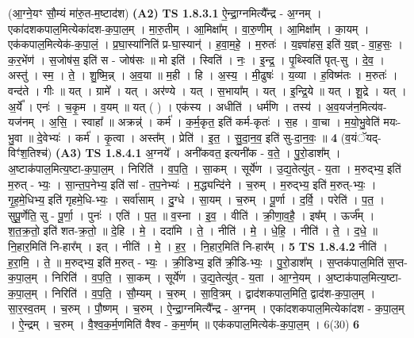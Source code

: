 \documentclass[17pt]{extarticle}
\begin{document}
                  \newline
                      (आ॒ग्ने॒यꣳ सौ॒म्यं मा॑रु॒त-म॒ष्टाद॑श)  \textbf{(A2)} \newline \newline
                                \textbf{ TS 1.8.3.1} \newline
                  ऐ॒न्द्रा॒ग्नमित्यै᳚न्द्र - अ॒ग्नम् । एका॑दशकपाल॒मित्येका॑दश-क॒पा॒ल॒म् । मा॒रु॒तीम् । आ॒मिक्षा᳚म् । वा॒रु॒णीम् । आ॒मिक्षा᳚म् । का॒यम् । एक॑कपाल॒मित्येक॑-क॒पा॒लं॒ । प्र॒घा॒स्या॑निति॑ प्र-घा॒स्यान्॑ । ह॒वा॒म॒हे॒ । म॒रुतः॑ । य॒ज्ञ्वा॑हस॒ इति॑ य॒ज्ञ् - वा॒ह॒सः॒ । क॒र॒भेंण॑ । स॒जोष॑स॒ इति॑ स - जोष॑सः ॥ मो इति॑ । स्विति॑ । नः॒ । इ॒न्द्र॒ । पृ॒थ्स्विति॑ पृत्-सु । दे॒व॒ । अस्तु॑ । स्म॒ । ते॒ । शु॒ष्मि॒न्न् । अ॒व॒या ॥ म॒ही । हि । अ॒स्य॒ । मी॒ढुषः॑ । य॒व्या । ह॒विष्म॑तः । म॒रुतः॑ । वन्द॑ते । गीः ॥ यत् । ग्रामे᳚ । यत् । अर॑ण्ये । यत् । स॒भाया᳚म् । यत् । इ॒न्द्रि॒ये ॥ यत् । शू॒द्रे । यत् । अ॒र्ये᳚ । एनः॑ । च॒कृ॒म । व॒यम् ॥ यत् ( ) । एक॑स्य । अधीति॑ । धर्म॑णि । तस्य॑ । अ॒व॒यज॑न॒मित्य॑व-यज॑नम् । अ॒सि॒ । स्वाहा᳚ ॥ अक्रन्न्॑ । कर्म॑ । क॒र्म॒कृत॒ इति॑ कर्म-कृतः॑ । स॒ह । वा॒चा । म॒यो॒भु॒वेति॑ मयः-भु॒वा ॥ दे॒वेभ्यः॑ । कर्म॑ । कृ॒त्वा । अस्त᳚म् । प्रेति॑ । इ॒त॒ । सु॒दा॒न॒व॒ इति॑ सु-दा॒न॒वः॒ ॥ \textbf{  4 } \newline
                  \newline
                      (व॒यंॅयद्-विꣳ॑श॒तिश्च॑)  \textbf{(A3)} \newline \newline
                                \textbf{ TS 1.8.4.1} \newline
                  अ॒ग्नये᳚ । अनी॑कवत॒ इत्यनी॑क - व॒ते॒ । पु॒रो॒डाश᳚म् । अ॒ष्टाक॑पाल॒मित्य॒ष्टा-क॒पा॒ल॒म् । निरिति॑ । व॒प॒ति॒ । सा॒कम् । सूर्ये॑ण । उ॒द्य॒तेत्यु॑त् - य॒ता । म॒रुद्भ्य॒ इति॑ म॒रुत् - भ्यः॒ । सा॒न्त॒प॒नेभ्य॒ इति॑ सां - त॒प॒नेभ्यः॑ । म॒द्ध्यन्दि॑ने । च॒रुम् । म॒रुद्भ्य॒ इति॑ म॒रुत्-भ्यः॒ । गृ॒ह॒मे॒धिभ्य॒ इति॑ गृहमे॒धि-भ्यः॒ । सर्वा॑साम् । दु॒ग्धे । सा॒यम् । च॒रुम् । पू॒र्णा । द॒र्वि॒ । परेति॑ । प॒त॒ । सुपू॒र्णेति॒ सु - पू॒र्णा॒ । पुनः॑ । एति॑ । प॒त॒ ॥ व॒स्ना । इ॒व॒ । वीति॑ । क्री॒णा॒व॒है॒ । इष᳚म् । ऊर्ज᳚म् । श॒त॒क्र॒तो॒ इति॑ शत-क्र॒तो॒ ॥ दे॒हि । मे॒ । ददा॑मि । ते॒ । नीति॑ । मे॒ । धे॒हि॒ । नीति॑ । ते॒ । द॒धे॒ ॥ नि॒हार॒मिति॑ नि-हार᳚म् । इत् । नीति॑ । मे॒ । ह॒र॒ । नि॒हार॒मिति॑ नि-हार᳚म् । \textbf{  5} \newline
                  \newline
                                \textbf{ TS 1.8.4.2} \newline
                  नीति॑ । ह॒रा॒मि॒ । ते॒ ॥ म॒रुद्भ्य॒ इति॑ म॒रुत् - भ्यः॒ । क्री॒डिभ्य॒ इति॑ क्री॒डि-भ्यः॒ । पु॒रो॒डाश᳚म् । स॒प्तक॑पाल॒मिति॑ स॒प्त-क॒पा॒ल॒म् । निरिति॑ । व॒प॒ति॒ । सा॒कम् । सूर्ये॑ण । उ॒द्य॒तेत्यु॑त् - य॒ता । आ॒ग्ने॒यम् । अ॒ष्टाक॑पाल॒मित्य॒ष्टा-क॒पा॒ल॒म् । निरिति॑ । व॒प॒ति॒ । सौ॒म्यम् । च॒रुम् । सा॒वि॒त्रम् । द्वाद॑शकपाल॒मिति॒ द्वाद॑श-क॒पा॒ल॒म् । सा॒र॒स्व॒तम् । च॒रुम् । पौ॒ष्णम् । च॒रुम् । ऐ॒न्द्रा॒ग्नमित्यै᳚न्द्र - अ॒ग्नम् । एका॑दशकपाल॒मित्येका॑दश - क॒पा॒ल॒म् । ऐ॒न्द्रम् । च॒रुम् । वै॒श्व॒क॒र्म॒णमिति॑ वैश्व - क॒म॒र्णम् ॥ एक॑कपाल॒मित्येक॑-क॒पा॒ल॒म् । 6(30) \textbf{  6 } \newline
\end{document}
